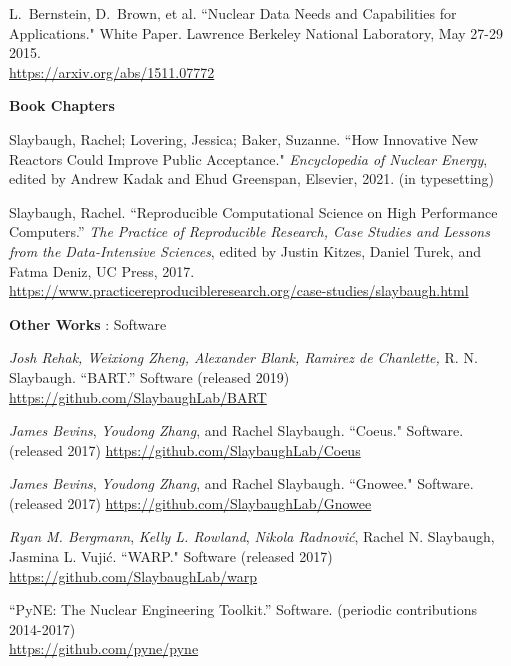 \begin{bibsection}
\item L.\ Bernstein, D.\ Brown, et al. ``Nuclear Data Needs and Capabilities for Applications." White Paper. Lawrence Berkeley National Laboratory, May 27-29 2015. \\
\url{https://arxiv.org/abs/1511.07772}


\item \textbf{Book Chapters}
\item Slaybaugh, Rachel; Lovering, Jessica; Baker, Suzanne. ``How Innovative New Reactors
Could Improve Public Acceptance." \textit{Encyclopedia of Nuclear Energy},
edited by Andrew Kadak and Ehud Greenspan, Elsevier, 2021. (in typesetting)

\item Slaybaugh, Rachel. ``Reproducible Computational Science on High Performance Computers.'' \textit{The Practice of Reproducible Research, Case Studies and Lessons from the Data-Intensive Sciences}, edited by Justin Kitzes, Daniel Turek, and Fatma Deniz, UC Press, 2017. \\ \url{https://www.practicereproducibleresearch.org/case-studies/slaybaugh.html}


\item \textbf{Other Works} : Software
\item \textit{Josh Rehak, Weixiong Zheng, Alexander Blank, Ramirez de Chanlette,} R. N. Slaybaugh. “BART.” Software (released 2019) \\
\url{https://github.com/SlaybaughLab/BART}

\item \textit{James Bevins}, \textit{Youdong Zhang}, and Rachel Slaybaugh. ``Coeus." Software. (released 2017) \url{https://github.com/SlaybaughLab/Coeus} 

\item \textit{James Bevins}, \textit{Youdong Zhang}, and Rachel Slaybaugh. ``Gnowee." Software. (released 2017) \url{https://github.com/SlaybaughLab/Gnowee} 

\item \textit{Ryan M. Bergmann}, \textit{Kelly L. Rowland}, \textit{Nikola Radnovi\'c}, Rachel N. Slaybaugh, Jasmina L. Vuji\'c. ``WARP." Software (released 2017) \url{https://github.com/SlaybaughLab/warp}

\item “PyNE: The Nuclear Engineering Toolkit.” Software. (periodic contributions 2014-2017) \\
\url{https://github.com/pyne/pyne}


\end{bibsection}
